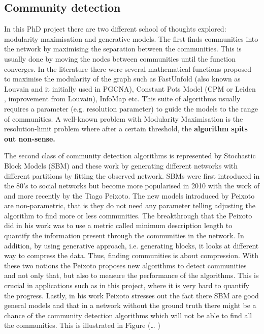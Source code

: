 \subsection{Community detection}

In this PhD project there are two different school of thoughts explored: modularity maximisation and generative models. The first finds communities into the network by maximising the separation between the communities. This is usually done by moving the nodes between communities until the function converges. In the literature there were several mathematical functions proposed to maximise the modularity of the graph such as FastUnfold \citet{Blondel2008-ik} (also known as Louvain and it initially used in PGCNA), Constant Pots Model (CPM or Leiden \citet{Traag2019-ne}, improvement from Louvain), InfoMap \citet{Rosvall2008-kw} etc. This suite of algorithms usually requires a parameter (e.g. resolution parameter) to guide the models to the range of communities. A well-known problem with Modularity Maximisation is the resolution-limit problem where after a certain threshold, the \textbf{algorithm spits out non-sense. }

The second class of community detection algorithms is represented by Stochastic Block Models (SBM) and these work by generating different networks with different partitions by fitting the observed network. SBMs were first introduced in the 80's to social networks \citet{Holland1983-oo} but become more popularised in 2010 with the work of \citet{Karrer2011-si} and more recently by the Tiago Peixoto. The new models introduced by Peixoto are non-parametric, that is they do not need any parameter telling adjusting the algorithm to find more or less communities. The breakthrough that the Peixoto did in his work was to use a metric called minimum description length to quantify the information present through the communities in the network. In addition, by using generative approach, i.e. generating blocks, it looks at different way to compress the data. Thus, finding communities is about compression. With these two notions the Peixoto proposes new algorithms to detect communities and not only that, but also to measure the performance of the algorithms. This is crucial in applications such as in this project, where it is very hard to quantify the progress. Lastly, in his work Peixoto stresses out the fact there SBM are good general models and that in a network without the ground truth there might be a chance of the community detection algorithms which will not be able to find all the communities. This is illustrated in Figure (… ) 

